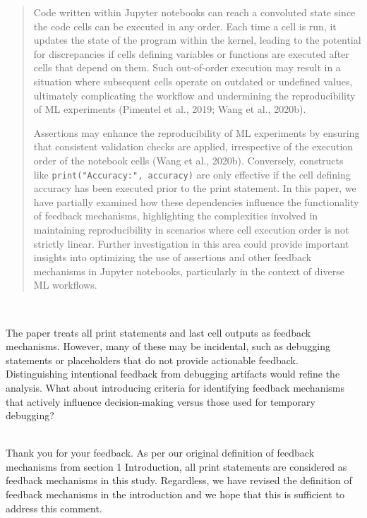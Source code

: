 \documentclass[11pt,fleqn]{article}
\newcommand{\eline}{\vspace*{.75\baselineskip}}
\newcommand{\Referee}[1]{\eline \noindent {\bf Reviewer comment #1:} \\}
\newcommand{\Us}{\eline \noindent {\bf Response:}\\}
\newenvironment{revcomment}[1][]
{\Referee{#1}\begin{rcomment}}
{\end{rcomment}}
\begin{document}
\begin{quote}
  Code written within Jupyter notebooks can reach a convoluted state since the code cells can be executed in any order. Each time a cell is run, it updates the state of the program within the kernel, leading to the potential for discrepancies if cells defining variables or functions are executed after cells that depend on them. Such out-of-order execution may result in a situation where subsequent cells operate on outdated or undefined values, ultimately complicating the workflow and undermining the reproducibility of ML experiments (Pimentel et al., 2019; Wang et al., 2020b).

  Assertions may enhance the reproducibility of ML experiments by ensuring that consistent validation checks are applied, irrespective of the execution order of the notebook cells (Wang et al., 2020b). Conversely, constructs like \texttt{print("Accuracy:", accuracy)} are only effective if the cell defining accuracy has been executed prior to the print statement. In this paper, we have partially examined how these dependencies influence the functionality of feedback mechanisms, highlighting the complexities involved in maintaining reproducibility in scenarios where cell execution order is not strictly linear. Further investigation in this area could provide important insights into optimizing the use of assertions and other feedback mechanisms in Jupyter notebooks, particularly in the context of diverse ML workflows.
\end{quote}

\begin{revcomment}[2.8]
  The paper treats all print statements and last cell outputs as feedback mechanisms. However, many of these may be incidental, such as debugging statements or placeholders that do not provide actionable feedback. Distinguishing intentional feedback from debugging artifacts would refine the analysis. What about introducing criteria for identifying feedback mechanisms that actively influence decision-making versus those used for temporary debugging?
\end{revcomment}

\Us Thank you for your feedback. As per our original definition of feedback mechanisms from section 1 Introduction, all print statements are considered as feedback mechanisms in this study. Regardless, we have revised the definition of feedback mechanisms in the introduction and we hope that this is sufficient to address this comment.
\end{document}
